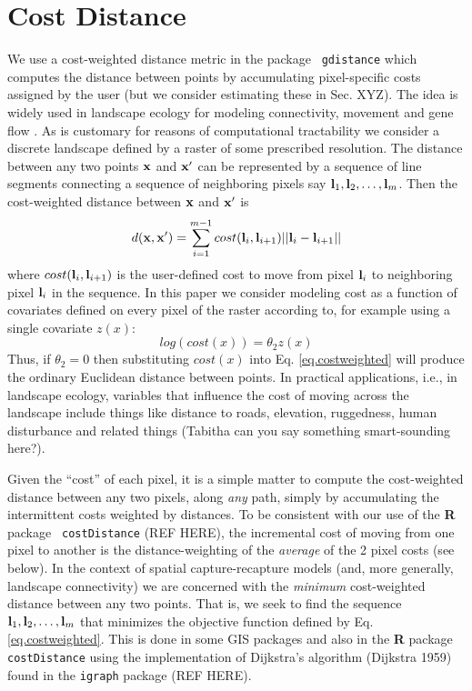 \section{Cost Distance}

We use a cost-weighted distance metric in the package \mbox{\tt
gdistance}  which computes the distance 
between points by accumulating pixel-specific costs assigned by the user 
(but we consider estimating these in Sec. XYZ). The idea is widely used in
landscape ecology for modeling connectivity, movement and gene flow
\citep{adriaensen_etal:2003,mcrae_etal:2008}. As is customary for reasons of
computational tractability we consider a discrete landscape defined by a 
raster of some prescribed resolution. The distance between any two points 
${\bf x}$ and ${\bf x}'$ can be represented by a sequence of line segments 
connecting a sequence of neighboring  pixels say 
${\bf l}_{1},{\bf l}_{2},\ldots,{\bf l}_{m}$. Then the cost-weighted distance 
between ${\bf x}$ and ${\bf x}'$ is
\begin{equation}
 d({\bf x},{\bf x}')
  =  \sum_{i=1}^{m-1} cost({\bf l}_{i},{\bf l}_{i+1})||{\bf l}_{i} - {\bf l}_{i+1}||
\label{eq.costweighted}
\end{equation}
where $cost({\bf l}_{i},{\bf l}_{i+1})$ is the user-defined cost to move 
from pixel ${\bf l}_{i}$ to neighboring pixel ${\bf l}_{i}$ in the sequence.
In this paper we consider modeling cost as a function of covariates
defined on every pixel of the raster according to, for example using a
single
covariate $z(x)$:
\begin{equation}
 log(cost(x))=  \theta_{2} z(x) 
\label{eq.cost}
\end{equation}
Thus, if $\theta_{2} = 0$ then substituting $cost(x)$ into
Eq. \ref{eq.costweighted} will produce the ordinary Euclidean distance
between points. 
In practical applications, i.e., in landscape ecology, variables that
influence the cost of moving across the landscape include things like
distance to roads, elevation, ruggedness, human disturbance and
related things (Tabitha can you say something smart-sounding here?).

Given the ``cost'' of each pixel, it is a simple matter to compute the
cost-weighted distance between any two pixels, along {\it any} path,
simply by accumulating the intermittent costs weighted by distances. 
To be consistent with our use of the {\bf R} package \mbox{\tt
  costDistance} (REF HERE),
the incremental cost of moving from one pixel to another is the
distance-weighting of the {\it average} of the 2 pixel costs (see below).
In the context of spatial capture-recapture models (and, more
generally, landscape connectivity) we are concerned with the {\it
  minimum} cost-weighted distance between any two points.  That is, we
seek to find the 
sequence ${\bf l}_{1},{\bf l}_{2},\ldots,{\bf l}_{m}$ that minimizes
the objective function defined by Eq. \ref{eq.costweighted}.
This is done in some GIS packages and also in the {\bf R} package
\mbox{\tt costDistance} using the implementation of Dijkstra's algorithm (Dijkstra 1959)
found in the \mbox{\tt igraph} package (REF HERE).

